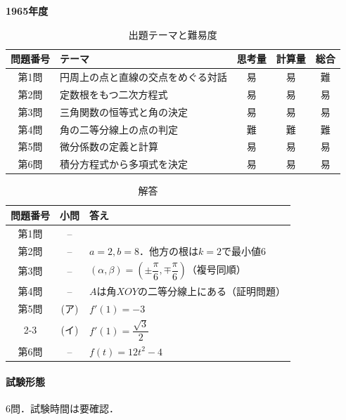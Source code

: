 \documentclass[../../main.tex]{subfiles}
\begin{document}
\begin{center}
  {\fontsize{48pt}{58pt}\selectfont \textbf{1965}\normalsize\textbf{年度}}
\end{center}

\begin{table}[htb]
  \centering
  \caption{出題テーマと難易度}
  \begin{tabular}{|c|p{6.2cm}|c|c|c|}
    \hline
    \textbf{問題番号} & \textbf{テーマ} & \textbf{思考量} & \textbf{計算量} & \textbf{総合} \\
    \hline
    第1問 & 円周上の点と直線の交点をめぐる対話 & 易 & 易 & 難 \\
    \hline
    第2問 & 定数根をもつ二次方程式 & 易 & 易 & 易 \\
    \hline
    第3問 & 三角関数の恒等式と角の決定 & 易 & 易 & 易 \\
    \hline
    第4問 & 角の二等分線上の点の判定 & 難 & 難 & 難 \\
    \hline
    第5問 & 微分係数の定義と計算 & 易 & 易 & 易 \\
    \hline
    第6問 & 積分方程式から多項式を決定 & 易 & 易 & 易 \\
    \hline
  \end{tabular}
\end{table}

\begin{table}[htb]
  \centering
  \caption{解答}
  \renewcommand{\arraystretch}{1.4}
  \begin{tabular}{|c|c|p{9cm}|}
    \hline
    \textbf{問題番号} & \textbf{小問} & \textbf{答え} \\
    \hline
    第1問 & -- &  \\
    \hline
    第2問 & -- & $a=2,b=8$．他方の根は$k=2$で最小値$6$ \\
    \hline
    第3問 & -- & $(\alpha,\beta)=(\pm\dfrac{\pi}{6},\mp\dfrac{\pi}{6})$（複号同順） \\
    \hline
    第4問 & -- & $A$は角$XOY$の二等分線上にある（証明問題） \\
    \hline
    第5問 & (ア) & $f\prime(1)=-3$ \\
    \cline{2-3}
    & (イ) & $f\prime(1)=\dfrac{\sqrt{3}}{2}$ \\
    \hline
    第6問 & -- & $f(t)=12t^2-4$ \\
    \hline
  \end{tabular}
\end{table}

\paragraph{試験形態}
6問．試験時間は要確認．
\end{document}
